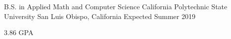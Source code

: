 

\begin{cventries}

  \cventry
  {B.S. in Applied Math and Computer Science} %
  {California Polytechnic State University} %
  {San Luis Obispo, California} %
  {Expected Summer 2019} %
  {
    \begin{cvitems} %
      \item {3.86 GPA}
    \end{cvitems}
  }

\end{cventries}
